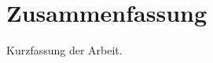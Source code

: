 \chapter*{Zusammenfassung}

\begin{otherlanguage}{ngerman}
Kurzfassung der Arbeit.
\end{otherlanguage}

\clearpage